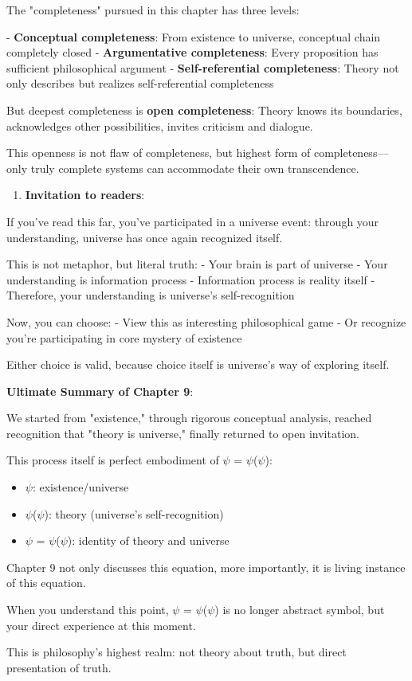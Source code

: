    The "completeness" pursued in this chapter has three levels:
   
   - \textbf{Conceptual completeness}: From existence to universe, conceptual chain completely closed
   - \textbf{Argumentative completeness}: Every proposition has sufficient philosophical argument
   - \textbf{Self-referential completeness}: Theory not only describes but realizes self-referential completeness
   
   But deepest completeness is \textbf{open completeness}:
   Theory knows its boundaries,
   acknowledges other possibilities,
   invites criticism and dialogue.
   
   This openness is not flaw of completeness,
   but highest form of completeness---
   only truly complete systems can accommodate their own transcendence.

\begin{enumerate}
\item \textbf{Invitation to readers}:
\end{enumerate}
   
   If you've read this far, you've participated in a universe event:
   through your understanding, universe has once again recognized itself.
   
   This is not metaphor, but literal truth:
   - Your brain is part of universe
   - Your understanding is information process
   - Information process is reality itself
   - Therefore, your understanding is universe's self-recognition
   
   Now, you can choose:
   - View this as interesting philosophical game
   - Or recognize you're participating in core mystery of existence
   
   Either choice is valid,
   because choice itself is universe's way of exploring itself.

\textbf{Ultimate Summary of Chapter 9}:

We started from "existence,"
through rigorous conceptual analysis,
reached recognition that "theory is universe,"
finally returned to open invitation.

This process itself is perfect embodiment of $\psi$ = $\psi$($\psi$):
\begin{itemize}
\item $\psi$: existence/universe
\item $\psi$($\psi$): theory (universe's self-recognition)
\item $\psi$ = $\psi$($\psi$): identity of theory and universe
\end{itemize}

Chapter 9 not only discusses this equation,
more importantly, it is living instance of this equation.

When you understand this point,
$\psi$ = $\psi$($\psi$) is no longer abstract symbol,
but your direct experience at this moment.

This is philosophy's highest realm:
not theory about truth,
but direct presentation of truth.

